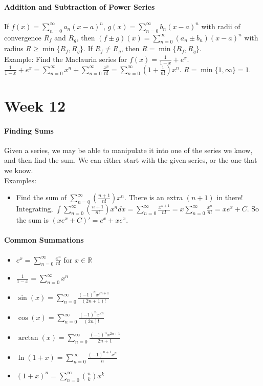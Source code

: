 \documentclass[10pt,letter]{article}
\begin{document}
\paragraph{Addition and Subtraction of Power Series} If $f(x)=\sum_{n=0}^\infty a_n(x-a)^n$, $g(x)=\sum_{n=0}^\infty b_n(x-a)^n$ with radii of convergence $R_f$ and $R_g$, then $(f\pm g)(x)=\sum_{n=0}^\infty (a_n\pm b_n)(x-a)^n$ with radius $R\geq\min\{R_f,R_g\}$. If $R_f\neq R_g$, then $R=\min\{R_f,R_g\}$. \\ 
Example: Find the Maclaurin series for $f(x)=\frac{1}{1-x}+e^x$. $\frac{1}{1-x}+e^x = \sum_{n=0}^\infty x^n+\sum_{n=0}^\infty\frac{x^n}{n!}=\sum_{n=0}^\infty (1+\frac{1}{n!})x^n$. $R=\min\{1,\infty\} = 1$. 

\pagebreak

\section*{Week 12}
\paragraph{Finding Sums} Given a series, we may be able to manipulate it into one of the series we know, and then find the sum. We can either start with the given series, or the one that we know. \\ 
Examples: \begin{itemize}
    \item Find the sum of $\sum_{n=0}^\infty\left(\frac{n+1}{n!}\right)x^n$. There is an extra $(n+1)$ in there! Integrating, $\int\sum_{n=0}^\infty\left(\frac{n+1}{n!}\right)x^n dx = \sum_{n=0}^\infty\frac{x^{n+1}}{n!}=x\sum_{n=0}^\infty\frac{x^n}{n!}=xe^x+C$. So the sum is $(xe^x+C)' = e^x + xe^x$.  
\end{itemize}

\paragraph{Common Summations} \begin{itemize}
    \item $e^x=\sum_{n=0}^\infty \frac{x^n}{n!}$ for $x\in\mathbb{R}$ 
    \item $\frac{1}{1-x}=\sum_{n=0}^\infty x^n$ 
    \item $\sin(x)=\sum_{n=0}^\infty\frac{(-1)^nx^{2n+1}}{(2n+1)!}$ 
    \item $\cos(x)=\sum_{n=0}^\infty\frac{(-1)^nx^{2n}}{(2n)!}$ 
    \item $\arctan(x)=\sum_{n=0}^\infty\frac{(-1)^nx^{2n+1}}{2n+1}$ 
    \item $\ln(1+x)=\sum_{n=0}^\infty\frac{(-1)^{n+1}x^n}{n}$ 
    \item $(1+x)^n = \sum_{n=0}^\infty {n\choose k}x^k$ 
\end{itemize}
\end{document}
